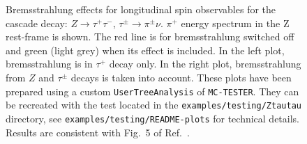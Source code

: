 \documentclass[]{Photos_interface_design}
\begin{document}
\begin{figure}[h!]
\centering
{}
\caption{ Bremsstrahlung effects for longitudinal spin observables
for the cascade decay: $Z \to \tau^+ \tau^-$, $\tau^\pm \to \pi^\pm\nu$.
$\pi^+$ energy spectrum in the Z rest-frame  is shown. The red line is for 
bremsstrahlung switched off
and green (light grey) when its effect is included. 
In the left plot, bremsstrahlung is in $\tau^+ $ decay only.
In the right plot, bremsstrahlung from $Z$ and  $\tau^\pm$ decays is
taken into account.
These plots have been prepared using a custom {\tt UserTreeAnalysis} of {\tt MC-TESTER}.
They  can be recreated with the test located in the {\tt examples/testing/Ztautau} directory, see  {\tt examples/testing/README-plots} for technical details. Results are 
consistent with Fig.~5 of Ref.~\cite{Eberhard:1989ve}.
\label{fig:KKMC}
}
\end{figure}
\end{document}
